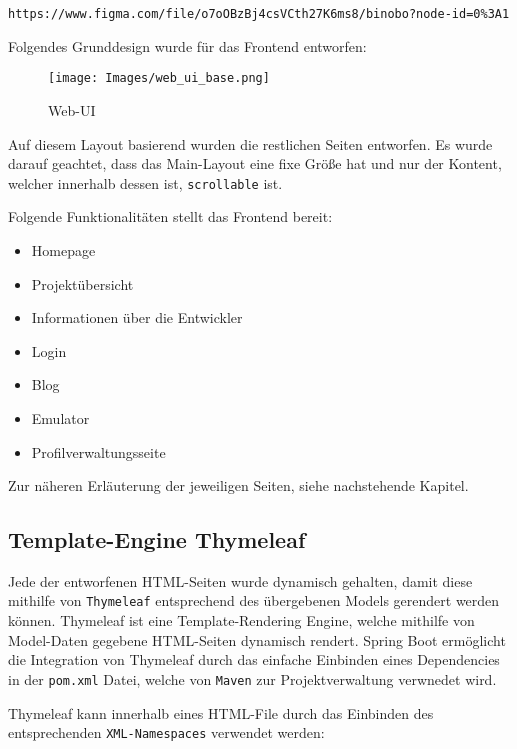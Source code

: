 \documentclass[paper=a4,12pt]{scrreprt}
\begin{document}
\texttt{https://www.figma.com/file/o7oOBzBj4csVCth27K6ms8/binobo?node-id=0\%3A1}\newline

Folgendes Grunddesign wurde für das Frontend entworfen:\newline
\begin{figure}[!h]
  \centering
  \texttt{[image: Images/web\_ui\_base.png]}
  \caption{Web-UI}
\end{figure}

Auf diesem Layout basierend wurden die restlichen Seiten entworfen. Es wurde darauf geachtet, dass das Main-Layout eine fixe Größe hat und nur der
Kontent, welcher innerhalb dessen ist, \texttt{scrollable} ist.\newline

Folgende Funktionalitäten stellt das Frontend bereit:\newline
\begin{itemize}
  \item Homepage
  \item Projektübersicht
  \item Informationen über die Entwickler
  \item Login
  \item Blog
  \item Emulator
  \item Profilverwaltungsseite
\end{itemize}

Zur näheren Erläuterung der jeweiligen Seiten, siehe nachstehende Kapitel.\newline

\subsection{Template-Engine Thymeleaf}

Jede der entworfenen HTML-Seiten wurde dynamisch gehalten, damit diese mithilfe von \texttt{Thymeleaf} entsprechend des übergebenen Models gerendert werden können\cite{thymeleaf}.\newline
Thymeleaf ist eine Template-Rendering Engine, welche mithilfe von Model-Daten gegebene HTML-Seiten dynamisch rendert. Spring Boot ermöglicht die Integration von Thymeleaf
durch das einfache Einbinden eines Dependencies in der \texttt{pom.xml} Datei, welche von \texttt{Maven} zur Projektverwaltung verwnedet wird.\newline

Thymeleaf kann innerhalb eines HTML-File durch das Einbinden des entsprechenden \texttt{XML-Namespaces} verwendet werden:\newline
\end{document}
